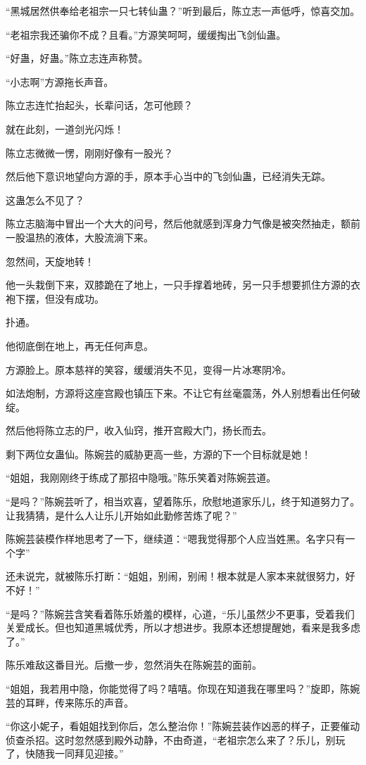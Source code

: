 \begin{this_body}
“黑城居然供奉给老祖宗一只七转仙蛊？”听到最后，陈立志一声低呼，惊喜交加。

“老祖宗我还骗你不成？且看。”方源笑呵呵，缓缓掏出飞剑仙蛊。

“好蛊，好蛊。”陈立志连声称赞。

“小志啊”方源拖长声音。

陈立志连忙抬起头，长辈问话，怎可他顾？

就在此刻，一道剑光闪烁！

陈立志微微一愣，刚刚好像有一股光？

然后他下意识地望向方源的手，原本手心当中的飞剑仙蛊，已经消失无踪。

这蛊怎么不见了？

陈立志脑海中冒出一个大大的问号，然后他就感到浑身力气像是被突然抽走，额前一股温热的液体，大股流淌下来。

忽然间，天旋地转！

他一头栽倒下来，双膝跪在了地上，一只手撑着地砖，另一只手想要抓住方源的衣袍下摆，但没有成功。

扑通。

他彻底倒在地上，再无任何声息。

方源脸上。原本慈祥的笑容，缓缓消失不见，变得一片冰寒阴冷。

如法炮制，方源将这座宫殿也镇压下来。不让它有丝毫震荡，外人别想看出任何破绽。

然后他将陈立志的尸，收入仙窍，推开宫殿大门，扬长而去。

剩下两位女蛊仙。陈婉芸的威胁更高一些，方源的下一个目标就是她！

“姐姐，我刚刚终于练成了那招中隐哦。”陈乐笑着对陈婉芸道。

“是吗？”陈婉芸听了，相当欢喜，望着陈乐，欣慰地道家乐儿，终于知道努力了。让我猜猜，是什么人让乐儿开始如此勤修苦炼了呢？”

陈婉芸装模作样地思考了一下，继续道：“嗯我觉得那个人应当姓黑。名字只有一个字”

还未说完，就被陈乐打断：“姐姐，别闹，别闹！根本就是人家本来就很努力，好不好！”

“是吗？”陈婉芸含笑看着陈乐娇羞的模样，心道，“乐儿虽然少不更事，受着我们关爱成长。但也知道黑城优秀，所以才想进步。我原本还想提醒她，看来是我多虑了。”

陈乐难敌这番目光。后撤一步，忽然消失在陈婉芸的面前。

“姐姐，我若用中隐，你能觉得了吗？嘻嘻。你现在知道我在哪里吗？”旋即，陈婉芸的耳畔，传来陈乐的声音。

“你这小妮子，看姐姐找到你后，怎么整治你！”陈婉芸装作凶恶的样子，正要催动侦查杀招。这时忽然感到殿外动静，不由奇道，“老祖宗怎么来了？乐儿，别玩了，快随我一同拜见迎接。”


\end{this_body}
